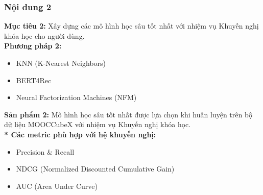 \subsubsection{Nội dung 2}
\textbf{Mục tiêu 2:} Xây dựng các mô hình học sâu tốt nhất với nhiệm vụ Khuyến nghị khóa học cho người dùng.\\
\textbf{Phương pháp 2:}
\begin{itemize}
    \item KNN (K-Nearest Neighbors)
    \item BERT4Rec
    \item Neural Factorization Machines (NFM)
\end{itemize}
\textbf{Sản phẩm 2:} Mô hình học sâu tốt nhất được lựa chọn khi huấn luyện trên bộ dữ liệu MOOCCubeX với nhiệm vụ Khuyến nghị khóa học.\\
\textbf{* Các metric phù hợp với hệ khuyến nghị:}
\begin{itemize}
    \item Precision \& Recall
    \item NDCG (Normalized Discounted Cumulative Gain)
    \item AUC (Area Under Curve)
\end{itemize}

